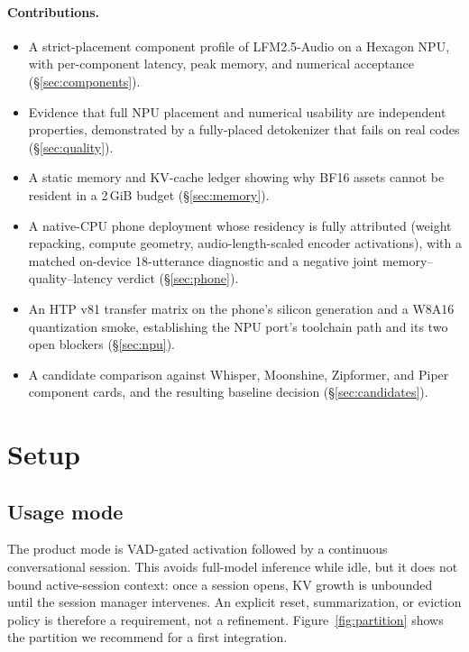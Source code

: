 \documentclass[10pt,twocolumn,letterpaper]{article}
\begin{document}
\paragraph{Contributions.}
\begin{itemize}\itemsep1pt \parskip0pt
\item A strict-placement component profile of LFM2.5-Audio on a Hexagon NPU,
      with per-component latency, peak memory, and numerical acceptance
      (\S\ref{sec:components}).
\item Evidence that full NPU placement and numerical usability are
      independent properties, demonstrated by a fully-placed detokenizer that
      fails on real codes (\S\ref{sec:quality}).
\item A static memory and KV-cache ledger showing why BF16 assets cannot be
      resident in a 2\,GiB budget (\S\ref{sec:memory}).
\item A native-CPU phone deployment whose residency is fully attributed
      (weight repacking, compute geometry, audio-length-scaled encoder
      activations), with a matched on-device 18-utterance diagnostic and a
      negative joint memory--quality--latency verdict (\S\ref{sec:phone}).
\item An HTP v81 transfer matrix on the phone's silicon generation and a
      W8A16 quantization smoke, establishing the NPU port's toolchain path
      and its two open blockers (\S\ref{sec:npu}).
\item A candidate comparison against Whisper, Moonshine, Zipformer, and Piper
      component cards, and the resulting baseline decision
      (\S\ref{sec:candidates}).
\end{itemize}

\section{Setup}

\subsection{Usage mode}

The product mode is VAD-gated activation followed by a continuous
conversational session. This avoids full-model inference while idle, but it
does not bound active-session context: once a session opens, KV growth is
unbounded until the session manager intervenes. An explicit reset,
summarization, or eviction policy is therefore a requirement, not a
refinement. Figure~\ref{fig:partition} shows the partition we recommend for a
first integration.
\end{document}
